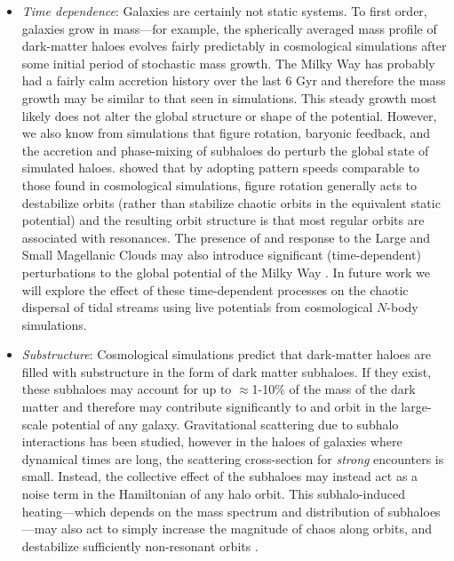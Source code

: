 \begin{itemize}
\item \emph{Time dependence}: Galaxies are certainly not static systems. To
first order, galaxies grow in mass---for example, the spherically averaged mass
profile of dark-matter haloes evolves fairly predictably in cosmological
simulations \citep{wechsler02, buist14} after some initial period of stochastic
mass growth. The Milky Way has probably had a fairly calm accretion history over
the last 6 Gyr and therefore the mass growth may be similar to that seen in
simulations. This steady growth most likely does not alter the global structure
or shape of the potential. However, we also know from simulations that figure
rotation, baryonic feedback, and the accretion and phase-mixing of subhaloes do
perturb the global state of simulated haloes. \cite{deibel11} showed that by
adopting pattern speeds comparable to those found in cosmological simulations,
figure rotation generally acts to destabilize orbits (rather than stabilize
chaotic orbits in the equivalent static potential) and the resulting orbit
structure is that most regular orbits are associated with resonances. The
presence of and response to the Large and Small Magellanic Clouds may also
introduce significant (time-dependent) perturbations to the global potential of
the Milky Way \citep[e.g.,][]{besla10, gomez15}. In future work we will explore
the effect of these time-dependent processes on the chaotic dispersal of tidal
streams using live potentials from cosmological $N$-body simulations.

\item \emph{Substructure}: Cosmological simulations predict that dark-matter
haloes are filled with substructure in the form of dark matter subhaloes. If
they exist, these subhaloes may account for up to $\approx$1-10\% of the mass of
the dark matter \citep[e.g.,][]{diemand07} and therefore may contribute
significantly to and orbit in the large-scale potential of any galaxy.
Gravitational scattering due to subhalo interactions has been studied, however
in the haloes of galaxies where dynamical times are long, the scattering
cross-section for \emph{strong} encounters is small. Instead, the collective
effect of the subhaloes may instead act as a noise term in the Hamiltonian of
any halo orbit. This subhalo-induced heating---which depends on the mass
spectrum and distribution of subhaloes---may also act to simply increase the
magnitude of chaos along orbits, and destabilize sufficiently non-resonant
orbits \citep[see, e.g.,][]{kandrup00, siegalgaskins08}.

\end{itemize}

